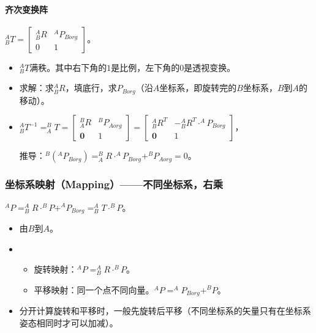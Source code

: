 \documentclass[
12pt, %
a4paper, 
oneside, %
headinclude,footinclude, %
]{scrartcl}
\begin{document}
\paragraph{齐次变换阵}
$ ^A_B T = \begin{bmatrix} ^A_B R & ^A P_{Borg} \\ 0 & 1 \end{bmatrix} $。
\begin{itemize}
\item $ ^A_B T $满秩。其中右下角的$ 1 $是比例，左下角的$ 0 $是透视变换。
\item 求解：求$ ^A_B R $，填底行，求$ P_{Borg} $（沿$ A $坐标系，即旋转完的$ B $坐标系，$ B $到$ A $的移动）。
\item 
$ 
^A_B T^{-1} = ^B_A T 
= \begin{bmatrix} ^B_A R & ^B P_{Aorg} \\ \mathbf{0} & 1 \end{bmatrix} 
= \begin{bmatrix} ^A_B R^T & -^A_B R^T \cdot ^A P_{Borg} \\ \mathbf{0} & 1 \end{bmatrix} 
$，

推导：$ ^B(^A P_{Borg}) = ^B_A R \cdot ^A P_{Borg} + ^B P_{Aorg} = 0 $。
\end{itemize}
\subsubsection[坐标系映射]{坐标系映射（Mapping）——不同坐标系，右乘}
$ ^A P = ^A_B R \cdot ^B P + ^A P_{Borg} = ^A_B T \cdot ^B P $。
\begin{itemize}
\item 由$ B $到$ A $。
\item 
\begin{itemize}
\item 旋转映射：$ ^A P = ^A_B R \cdot ^B P $。
\item 平移映射：同一个点不同向量。$ ^A P = ^A P_{Borg} + ^B P $。
\end{itemize}
\item 分开计算旋转和平移时，一般先旋转后平移（不同坐标系的矢量只有在坐标系姿态相同时才可以加减）。
\end{itemize}
\end{document}
